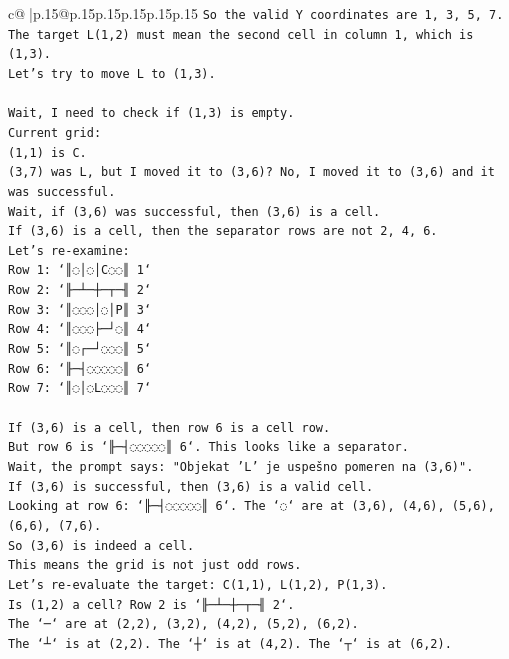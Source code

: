 \documentclass{article}
\begin{document}
{\begin{supertabular}{c@{$\;$}|p{.15\linewidth}@{}p{.15\linewidth}p{.15\linewidth}p{.15\linewidth}p{.15\linewidth}p{.15\linewidth}}
{{{\texttt{So the valid Y coordinates are 1, 3, 5, 7.} \\
\texttt{The target L(1,2) must mean the second cell in column 1, which is (1,3).} \\
\texttt{Let's try to move L to (1,3).} \\
\\ 
\texttt{Wait, I need to check if (1,3) is empty.} \\
\texttt{Current grid:} \\
\texttt{(1,1) is C.} \\
\texttt{(3,7) was L, but I moved it to (3,6)? No, I moved it to (3,6) and it was successful.} \\
\texttt{Wait, if (3,6) was successful, then (3,6) is a cell.} \\
\texttt{If (3,6) is a cell, then the separator rows are not 2, 4, 6.} \\
\texttt{Let's re{-}examine:} \\
\texttt{Row 1: `║◌│◌│C◌◌║ 1`} \\
\texttt{Row 2: `╟─┴─┼─┬─╢ 2`} \\
\texttt{Row 3: `║◌◌◌│◌│P║ 3`} \\
\texttt{Row 4: `║◌◌◌├─┘◌║ 4`} \\
\texttt{Row 5: `║◌┌─┘◌◌◌║ 5`} \\
\texttt{Row 6: `╟─┤◌◌◌◌◌║ 6`} \\
\texttt{Row 7: `║◌│◌L◌◌◌║ 7`} \\
\\ 
\texttt{If (3,6) is a cell, then row 6 is a cell row.} \\
\texttt{But row 6 is `╟─┤◌◌◌◌◌║ 6`. This looks like a separator.} \\
\texttt{Wait, the prompt says: "Objekat 'L' je uspešno pomeren na (3,6)".} \\
\texttt{If (3,6) is successful, then (3,6) is a valid cell.} \\
\texttt{Looking at row 6: `╟─┤◌◌◌◌◌║ 6`. The `◌` are at (3,6), (4,6), (5,6), (6,6), (7,6).} \\
\texttt{So (3,6) is indeed a cell.} \\
\texttt{This means the grid is not just odd rows.} \\
\texttt{Let's re{-}evaluate the target: C(1,1), L(1,2), P(1,3).} \\
\texttt{Is (1,2) a cell? Row 2 is `╟─┴─┼─┬─╢ 2`.} \\
\texttt{The `─` are at (2,2), (3,2), (4,2), (5,2), (6,2).} \\
\texttt{The `┴` is at (2,2). The `┼` is at (4,2). The `┬` is at (6,2).} \\
}}}
\end{supertabular}}
\end{document}
